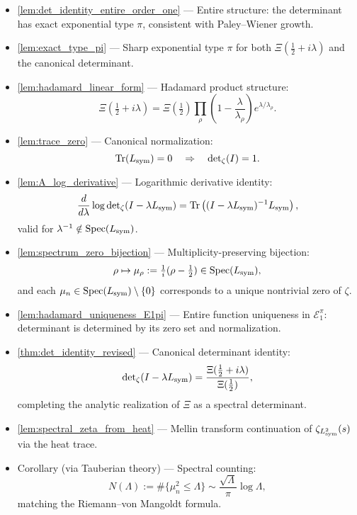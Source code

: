 \begin{itemize}
  \item \cref{lem:det_identity_entire_order_one} — Entire structure: the determinant has exact exponential type \( \pi \), consistent with Paley--Wiener growth.

  \item \cref{lem:exact_type_pi} — Sharp exponential type \( \pi \) for both \( \Xi(\tfrac{1}{2} + i\lambda) \) and the canonical determinant.

  \item \cref{lem:hadamard_linear_form} — Hadamard product structure:
  \[
  \Xi\left( \tfrac{1}{2} + i\lambda \right) = \Xi\left( \tfrac{1}{2} \right) \prod_{\rho} \left(1 - \frac{\lambda}{\lambda_\rho}\right) e^{\lambda/\lambda_\rho}.
  \]

  \item \cref{lem:trace_zero} — Canonical normalization:
  \[
  \operatorname{Tr}(L_{\mathrm{sym}}) = 0 \quad \Rightarrow \quad \det\nolimits_\zeta(I) = 1.
  \]

  \item \cref{lem:A_log_derivative} — Logarithmic derivative identity:
  \[
  \frac{d}{d\lambda} \log \det\nolimits_\zeta(I - \lambda L_{\mathrm{sym}}) = \operatorname{Tr}\left( (I - \lambda L_{\mathrm{sym}})^{-1} L_{\mathrm{sym}} \right),
  \]
  valid for \( \lambda^{-1} \notin \operatorname{Spec}(L_{\mathrm{sym}}) \).

  \item \cref{lem:spectrum_zero_bijection} — Multiplicity-preserving bijection:
  \[
  \rho \mapsto \mu_\rho := \tfrac{1}{i}(\rho - \tfrac{1}{2}) \in \operatorname{Spec}(L_{\mathrm{sym}}),
  \]
  and each \( \mu_n \in \operatorname{Spec}(L_{\mathrm{sym}}) \setminus \{0\} \) corresponds to a unique nontrivial zero of \( \zeta \).

  \item \cref{lem:hadamard_uniqueness_E1pi} — Entire function uniqueness in \( \mathcal{E}_1^\pi \): determinant is determined by its zero set and normalization.

  \item \cref{thm:det_identity_revised} — Canonical determinant identity:
  \[
  \det\nolimits_\zeta(I - \lambda L_{\mathrm{sym}}) = \frac{\Xi(\tfrac{1}{2} + i\lambda)}{\Xi(\tfrac{1}{2})},
  \]
  completing the analytic realization of \( \Xi \) as a spectral determinant.

  \item \cref{lem:spectral_zeta_from_heat} — Mellin transform continuation of \( \zeta_{L_{\mathrm{sym}}^2}(s) \) via the heat trace.

  \item Corollary (via Tauberian theory) — Spectral counting:
  \[
  N(\Lambda) := \#\{ \mu_n^2 \le \Lambda \} \sim \frac{\sqrt{\Lambda}}{\pi} \log \Lambda,
  \]
  matching the Riemann--von Mangoldt formula.
\end{itemize}

